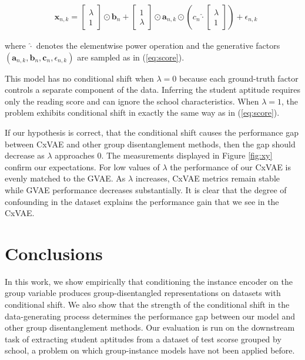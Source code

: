 \documentclass{article} %
\begin{document}
\begin{align}
& \mathbf{x}_{n,k} = \begin{bmatrix} \lambda \\ 1 \end{bmatrix} \odot \mathbf{b}_n + \begin{bmatrix} 1 \\ \lambda \end{bmatrix} \odot \mathbf{a}_{n,k} \odot \left(c_n \hat{\cdot} \begin{bmatrix} \lambda \\ 1 \end{bmatrix} \right) + \epsilon_{n,k}
\end{align}

where $\hat{\cdot}$ denotes the elementwise power operation and the generative factors $(\mathbf{a}_{n,k}, \mathbf{b}_n, \mathbf{c}_n, \epsilon_{n,k})$ are sampled as in (\ref{eq:score}).

This model has no conditional shift when $\lambda=0$ because each ground-truth factor controls a separate component of the data. Inferring the student aptitude requires only the reading score and can ignore the school characteristics. When $\lambda=1$, the problem exhibits conditional shift in exactly the same way as in (\ref{eq:score}).

If our hypothesis is correct, that the conditional shift causes the performance gap between CxVAE and other group disentanglement methods, then the gap should decrease as $\lambda$ approaches 0. The measurements displayed in Figure \ref{fig:xy} confirm our expectations. For low values of $\lambda$ the performance of our CxVAE is evenly matched to the GVAE.  As $\lambda$ increases, CxVAE metrics remain stable while GVAE performance decreases substantially.  It is clear that the degree of confounding in the dataset explains the performance gain that we see in the CxVAE. 

\section{Conclusions}
\label{sec:conclusion}

In this work, we show empirically that conditioning the instance encoder on the group variable produces group-disentangled representations on datasets with conditional shift. We also show that the strength of the conditional shift in the data-generating process determines the performance gap between our model and other group disentanglement methods. Our evaluation is run on the downstream task of extracting student aptitudes from a dataset of test scorse grouped by school, a problem on which group-instance models have not been applied before.
\end{document}
